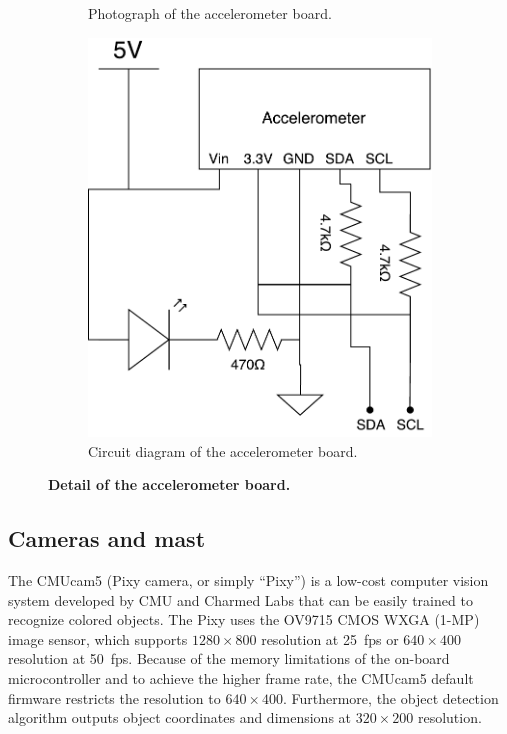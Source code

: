 \documentclass[letterpaper, 11pt]{article}
\begin{document}
\begin{enumerate}[label=\textbf{\arabic*.}]
\begin{figure}[ht]
\begin{subfigure}[t]{0.48\textwidth}
        \caption{Photograph of the accelerometer board.}
    \end{subfigure}\hfill
    \begin{subfigure}[t]{0.48\textwidth}
        \centering
        \includegraphics[height=0.4\textheight]{images/accel-schematic.pdf}
        \caption{Circuit diagram of the accelerometer board.}
    \end{subfigure}
    \caption{\textbf{Detail of the accelerometer board.}}
    \label{fig:accel-board}
\end{figure}

\subsection{Cameras and mast}
The CMUcam5 (Pixy camera, or simply ``Pixy'') is a low-cost computer vision system developed by CMU and Charmed Labs that can be easily trained to recognize colored objects. The Pixy uses the OV9715 CMOS WXGA (1-MP) image sensor, which supports $1280\times 800$ resolution at \SI{25}{fps} or $640\times 400$ resolution at \SI{50}{fps}. Because of the memory limitations of the on-board microcontroller and to achieve the higher frame rate, the CMUcam5 default firmware restricts the resolution to $640\times 400$. Furthermore, the object detection algorithm outputs object coordinates and dimensions at $320\times 200$ resolution.


\end{enumerate}
\end{document}
